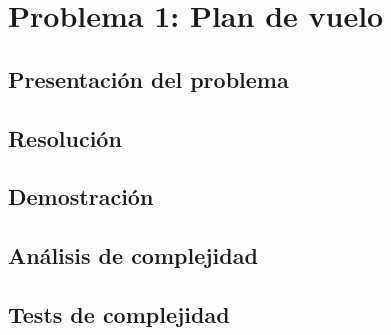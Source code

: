 \section{Problema 1: Plan de vuelo}

\subsection{Presentación del problema}

\subsection{Resolución}

\subsection{Demostración}

\subsection{Análisis de complejidad}

\subsection{Tests de complejidad}
